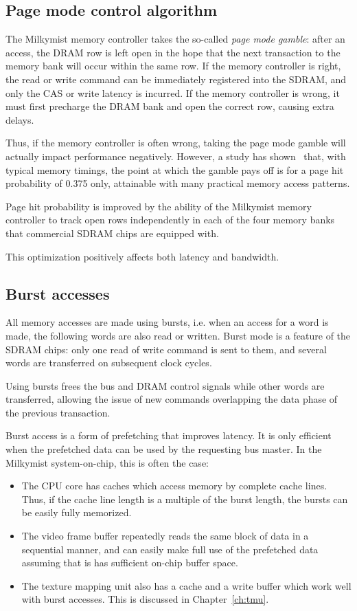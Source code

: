 \documentclass[a4paper,11pt]{kthesis}
\begin{document}
\subsection{Page mode control algorithm}
The Milkymist memory controller takes the so-called \textit{page mode gamble}: after an access, the DRAM row is left open in the hope that the next transaction to the memory bank will occur within the same row. If the memory controller is right, the read or write command can be immediately registered into the SDRAM, and only the CAS or write latency is incurred. If the memory controller is wrong, it must first precharge the DRAM bank and open the correct row, causing extra delays.

Thus, if the memory controller is often wrong, taking the page mode gamble will actually impact performance negatively. However, a study has shown~\cite{pagemode} that, with typical memory timings, the point at which the gamble pays off is for a page hit probability of 0.375 only, attainable with many practical memory access patterns.

Page hit probability is improved by the ability of the Milkymist memory controller to track open rows independently in each of the four memory banks that commercial SDRAM chips are equipped with.

This optimization positively affects both latency and bandwidth.

\subsection{Burst accesses}
\label{subsec:fmlburst}
All memory accesses are made using bursts, i.e. when an access for a word is made, the following words are also read or written. Burst mode is a feature of the SDRAM chips: only one read of write command is sent to them, and several words are transferred on subsequent clock cycles.

Using bursts frees the bus and DRAM control signals while other words are transferred, allowing the issue of new commands overlapping the data phase of the previous transaction.

Burst access is a form of prefetching that improves latency. It is only efficient when the prefetched data can be used by the requesting bus master. In the Milkymist system-on-chip, this is often the case:
\begin{itemize}
\item The CPU core has caches which access memory by complete cache lines. Thus, if the cache line length is a multiple of the burst length, the bursts can be easily fully memorized.
\item The video frame buffer repeatedly reads the same block of data in a sequential manner, and can easily make full use of the prefetched data assuming that is has sufficient on-chip buffer space.
\item The texture mapping unit also has a cache and a write buffer which work well with burst accesses. This is discussed in Chapter~\ref{ch:tmu}.
\end{itemize}
\end{document}
